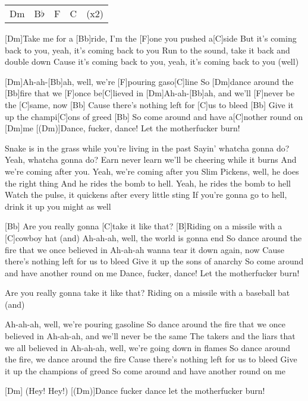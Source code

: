 

\begin{guitar}
	{\footnotesize\begin{tabular}{l|l|l|l l}
			Dm & B$\flat$ & F & C & (x2)
	\end{tabular}}
	
	[Dm]Take me for a [Bb]ride, I'm the [F]one you pushed a[C]side
	But it's coming back to you, yeah, it's coming back to you
	Run to the sound, take it back and double down
	Cause it's coming back to you, yeah, it's coming back to you (well)
	
	[Dm]Ah-ah-[Bb]ah, well, we're [F]pouring gaso[C]line
	So [Dm]dance around the [Bb]fire that we [F]once be[C]lieved in
	[Dm]Ah-ah-[Bb]ah, and we'll [F]never be the [C]same, now
	[Bb] Cause there's nothing left for [C]us to bleed
	[Bb] Give it up the champi[C]ons of greed
	[Bb] So come around and have a[C]nother round on [Dm]me
	[(Dm)]Dance, fucker, dance! Let the motherfucker burn!
	
	Snake is in the grass while you're living in the past
	Sayin' whatcha gonna do? Yeah, whatcha gonna do?
	Earn never learn we'll be cheering while it burns
	And we're coming after you. Yeah, we're coming after you
	Slim Pickens, well, he does the right thing
	And he rides the bomb to hell. Yeah, he rides the bomb to hell
	Watch the pulse, it quickens after every little sting
	If you're gonna go to hell, drink it up you might as well
	
	[Bb] Are you really gonna [C]take it like that?
	[B]Riding on a missile with a [C]cowboy hat (and)
	\pagebreak
	Ah-ah-ah, well, the world is gonna end
	So dance around the fire that we once believed in
	Ah-ah-ah wanna tear it down again, now
	Cause there's nothing left for us to bleed
	Give it up the sons of anarchy
	So come around and have another round on me
	Dance, fucker, dance! Let the motherfucker burn!
	
	
	Are you really gonna take it like that?
	Riding on a missile with a baseball bat (and)
	
	Ah-ah-ah, well, we're pouring gasoline
	So dance around the fire that we once believed in
	Ah-ah-ah, and we'll never be the same
	The takers and the liars that we all believed in
	Ah-ah-ah, well, we're going down in flames
	So dance around the fire, we dance around the fire
	Cause there's nothing left for us to bleed
	Give it up the champions of greed
	So come around and have another round on me
	
	[Dm] (Hey! Hey!)
	[(Dm)]Dance fucker dance let the motherfucker burn!
\end{guitar}